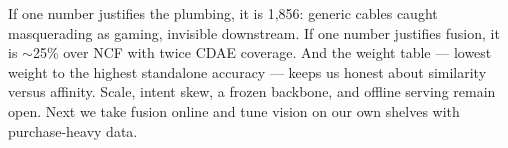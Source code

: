 \documentclass[conference]{IEEEtran}
\begin{document}
If one number justifies the plumbing, it is 1{,}856: generic cables caught masquerading
as gaming, invisible downstream. If one number justifies fusion, it is $\sim$25\%
over NCF with twice CDAE coverage. And the weight table --- lowest weight to the
highest standalone accuracy --- keeps us honest about similarity versus affinity.
Scale, intent skew, a frozen backbone, and offline serving remain open. Next we take
fusion online and tune vision on our own shelves with purchase-heavy data.




\end{document}
